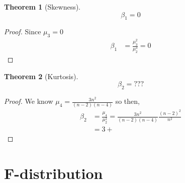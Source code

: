 \documentclass[oneside,11pt,pdftex]{book}%
\numberwithin{equation}{section}
\newtheorem{theorem}{Theorem}[chapter]%
\numberwithin{section}{chapter}
\numberwithin{equation}{chapter}
\begin{document}
\begin{theorem}[Skewness]
	$$ \beta_1=0 $$
\end{theorem}
\begin{proof}
	Since $ \mu_3=0 $
	\begin{align*}
		\beta_1&=\frac{\mu_3^2}{\mu_2^3}=0
	\end{align*}
\end{proof}

\begin{theorem}[Kurtosis]
	\[ \beta_2=??? \]
\end{theorem}
\begin{proof}
	We know $ \mu_4=\frac{3n^2}{(n-2)(n-4)} $ so then,
	\begin{align*}
		\beta_2&=\frac{\mu_4}{\mu_2^2}=\frac{3n^2}{(n-2)(n-4)} \frac{(n-2)^2}{n^2}\\
		&=3+
	\end{align*}
\end{proof}

\chapter{F-distribution}


\backmatter


\thispagestyle{empty}%
{\ }
\newpage
\end{document}
